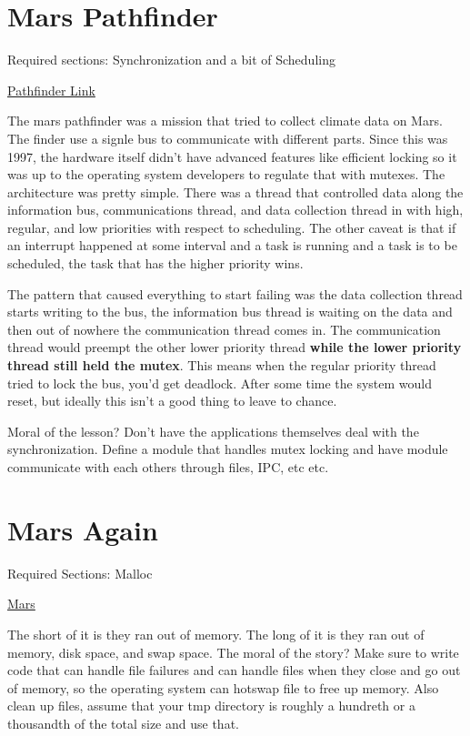 \section{Mars Pathfinder}

Required sections: Synchronization and a bit of Scheduling

\href{https://www.microsoft.com/en-us/research/people/mbj/#!just-for-fun}{Pathfinder Link}

The mars pathfinder was a mission that tried to collect climate data on Mars. The finder use a signle bus to communicate with different parts. Since this was 1997, the hardware itself didn't have advanced features like efficient locking so it was up to the operating system developers to regulate that with mutexes. The architecture was pretty simple. There was a thread that controlled data along the information bus, communications thread, and data collection thread in with high, regular, and low priorities with respect to scheduling. The other caveat is that if an interrupt happened at some interval and a task is running and a task is to be scheduled, the task that has the higher priority wins.

The pattern that caused everything to start failing was the data collection thread starts writing to the bus, the information bus thread is waiting on the data and then out of nowhere the communication thread comes in. The communication thread would preempt the other lower priority thread \textbf{while the lower priority thread still held the mutex}. This means when the regular priority thread tried to lock the bus, you'd get deadlock. After some time the system would reset, but ideally this isn't a good thing to leave to chance.

Moral of the lesson? Don't have the applications themselves deal with the synchronization. Define a module that handles mutex locking and have module communicate with each others through files, IPC, etc etc.

\section{Mars Again}

Required Sections: Malloc

\href{https://www.computerworld.com/article/2574759/data-storage-solutions/out-of-memory-problem-caused-mars-rover-s-glitch.html}{Mars}

The short of it is they ran out of memory. The long of it is they ran out of memory, disk space, and swap space. The moral of the story? Make sure to write code that can handle file failures and can handle files when they close and go out of memory, so the operating system can hotswap file to free up memory. Also clean up files, assume that your tmp directory is roughly a hundreth or a thousandth of the total size and use that.

